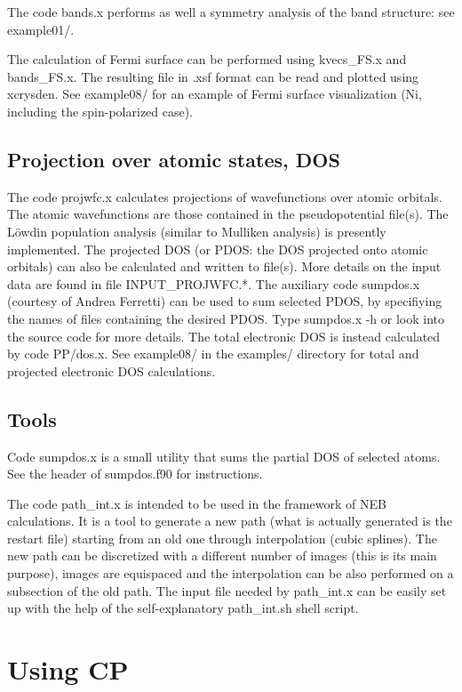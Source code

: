\documentclass[12pt,a4paper]{article}
\begin{document}
The code bands.x performs as well a symmetry analysis of the band structure:
see example01/. 

The calculation of Fermi surface can be performed using kvecs\_FS.x and
bands\_FS.x. The resulting file in .xsf format can be read and plotted
using xcrysden. See example08/ for an example of Fermi surface 
visualization (Ni, including the spin-polarized case).

\subsection{Projection over atomic states, DOS}

The code projwfc.x calculates projections of wavefunctions
over atomic orbitals. The atomic wavefunctions are those contained
in the pseudopotential file(s). The L\"owdin population analysis (similar to
Mulliken analysis) is presently implemented. The projected DOS (or PDOS:
the DOS projected onto atomic orbitals) can also be calculated and written
to file(s). More details on the input data are found in file
INPUT\_PROJWFC.*.  
The auxiliary code sumpdos.x (courtesy of Andrea Ferretti) 
can be used to sum selected PDOS, by specifiying the names of files
containing the desired PDOS. Type sumpdos.x -h or look into the source
code for more details. The total electronic DOS is instead calculated by code
PP/dos.x. See example08/ in the examples/ directory for total and projected 
electronic DOS calculations.

\subsection{Tools}

Code sumpdos.x is a small utility that sums the partial DOS of
selected atoms. See the header of  sumpdos.f90 for instructions.

The code path\_int.x is intended to be used in the framework of NEB
calculations. It is a tool to generate a new path (what is actually
generated is the restart file) starting from an old one through
interpolation (cubic splines). The new path can be discretized with a
different number of images (this is its main purpose), images are
equispaced and the interpolation can be also 
performed on a subsection of the old path. The input file needed by
path\_int.x can be easily set up  with the help of the self-explanatory
path\_int.sh shell script. 

\section{Using CP}
\end{document}

